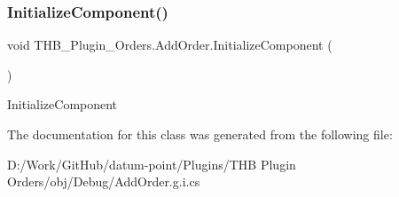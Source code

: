 \subsubsection{\texorpdfstring{Initialize\+Component()}{InitializeComponent()}\hspace{0.1cm}{\footnotesize\ttfamily [2/2]}}
{\footnotesize\ttfamily void T\+H\+B\+\_\+\+Plugin\+\_\+\+Orders.\+Add\+Order.\+Initialize\+Component (\begin{DoxyParamCaption}{ }\end{DoxyParamCaption})}



Initialize\+Component 



The documentation for this class was generated from the following file\+:\begin{DoxyCompactItemize}
\item 
D\+:/\+Work/\+Git\+Hub/datum-\/point/\+Plugins/\+T\+H\+B Plugin Orders/obj/\+Debug/Add\+Order.\+g.\+i.\+cs\end{DoxyCompactItemize}
